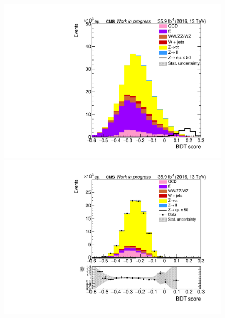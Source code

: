  
\begin{figure}[htp]
	\centering

	\begin{multicols}{2}
		\includegraphics[width=\linewidth]{plots/em/BDTScore.pdf}\par 
		\includegraphics[width=\linewidth]{plots/em/BDTScore_ZTTCR}\par
	\end{multicols}


\end{figure}
